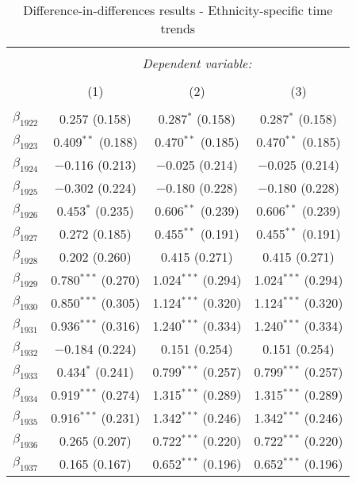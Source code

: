 
\begin{table}[!h] \centering 
  \caption{Difference-in-differences results - Ethnicity-specific time trends} 
  \label{dif_table_trends} 
\small 
\begin{tabular}{@{\extracolsep{5pt}}lccc} 
\\[-1.8ex]\hline 
\hline \\[-1.8ex] 
 & \multicolumn{3}{c}{\textit{Dependent variable:}} \\ 
\cline{2-4} 
\\[-1.8ex] & (1) & (2) & (3)\\ 
\hline \\[-1.8ex] 
 $\beta_{1922}$ & 0.257 (0.158) & 0.287$^{*}$ (0.158) & 0.287$^{*}$ (0.158) \\ 
  $\beta_{1923}$ & 0.409$^{**}$ (0.188) & 0.470$^{**}$ (0.185) & 0.470$^{**}$ (0.185) \\ 
  $\beta_{1924}$ & $-$0.116 (0.213) & $-$0.025 (0.214) & $-$0.025 (0.214) \\ 
  $\beta_{1925}$ & $-$0.302 (0.224) & $-$0.180 (0.228) & $-$0.180 (0.228) \\ 
  $\beta_{1926}$ & 0.453$^{*}$ (0.235) & 0.606$^{**}$ (0.239) & 0.606$^{**}$ (0.239) \\ 
  $\beta_{1927}$ & 0.272 (0.185) & 0.455$^{**}$ (0.191) & 0.455$^{**}$ (0.191) \\ 
  $\beta_{1928}$ & 0.202 (0.260) & 0.415 (0.271) & 0.415 (0.271) \\ 
  $\beta_{1929}$ & 0.780$^{***}$ (0.270) & 1.024$^{***}$ (0.294) & 1.024$^{***}$ (0.294) \\ 
  $\beta_{1930}$ & 0.850$^{***}$ (0.305) & 1.124$^{***}$ (0.320) & 1.124$^{***}$ (0.320) \\ 
  $\beta_{1931}$ & 0.936$^{***}$ (0.316) & 1.240$^{***}$ (0.334) & 1.240$^{***}$ (0.334) \\ 
  $\beta_{1932}$ & $-$0.184 (0.224) & 0.151 (0.254) & 0.151 (0.254) \\ 
  $\beta_{1933}$ & 0.434$^{*}$ (0.241) & 0.799$^{***}$ (0.257) & 0.799$^{***}$ (0.257) \\ 
  $\beta_{1934}$ & 0.919$^{***}$ (0.274) & 1.315$^{***}$ (0.289) & 1.315$^{***}$ (0.289) \\ 
  $\beta_{1935}$ & 0.916$^{***}$ (0.231) & 1.342$^{***}$ (0.246) & 1.342$^{***}$ (0.246) \\ 
  $\beta_{1936}$ & 0.265 (0.207) & 0.722$^{***}$ (0.220) & 0.722$^{***}$ (0.220) \\ 
  $\beta_{1937}$ & 0.165 (0.167) & 0.652$^{***}$ (0.196) & 0.652$^{***}$ (0.196) \\ 

\end{tabular}
\end{table}
